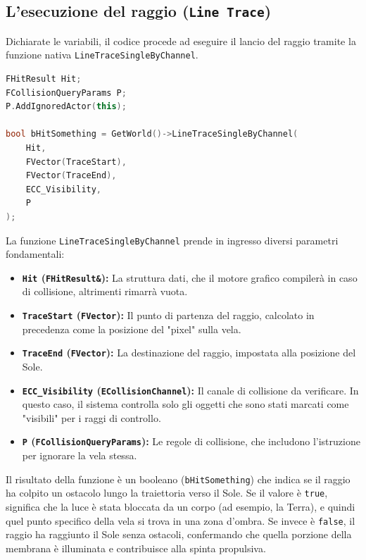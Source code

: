 
\subsection{L'esecuzione del raggio (\texttt{Line Trace})}

Dichiarate le variabili, il codice procede ad eseguire il lancio del raggio tramite la funzione nativa \lstinline|LineTraceSingleByChannel|. 

\begin{lstlisting}[language=C++, caption={Esecuzione del raggio di occlusione solare.}]
FHitResult Hit;
FCollisionQueryParams P;
P.AddIgnoredActor(this);

bool bHitSomething = GetWorld()->LineTraceSingleByChannel(
    Hit, 
    FVector(TraceStart), 
    FVector(TraceEnd), 
    ECC_Visibility, 
    P
);
\end{lstlisting}

La funzione \lstinline|LineTraceSingleByChannel| prende in ingresso diversi parametri fondamentali:
\begin{itemize}
    \item \textbf{\lstinline|Hit| (\lstinline|FHitResult&|):} La struttura dati, che il motore grafico compilerà in caso di collisione, altrimenti rimarrà vuota.
    \item \textbf{\lstinline|TraceStart| (\lstinline|FVector|):} Il punto di partenza del raggio, calcolato in precedenza come la posizione del "pixel" sulla vela.
    \item \textbf{\lstinline|TraceEnd| (\lstinline|FVector|):} La destinazione del raggio, impostata alla posizione del Sole.
    \item \textbf{\lstinline|ECC_Visibility| (\lstinline|ECollisionChannel|):} Il canale di collisione da verificare. In questo caso, il sistema controlla solo gli oggetti che sono stati marcati come "visibili" per i raggi di controllo.
    \item \textbf{\lstinline|P| (\lstinline|FCollisionQueryParams|):} Le regole di collisione, che includono l'istruzione per ignorare la vela stessa.
\end{itemize}

Il risultato della funzione è un booleano (\lstinline|bHitSomething|) che indica se il raggio ha colpito un ostacolo lungo la traiettoria verso il Sole. Se il valore è \lstinline|true|, significa che la luce è stata bloccata da un corpo (ad esempio, la Terra), e quindi quel punto specifico della vela si trova in una zona d'ombra. Se invece è \lstinline|false|, il raggio ha raggiunto il Sole senza ostacoli, confermando che quella porzione della membrana è illuminata e contribuisce alla spinta propulsiva.


